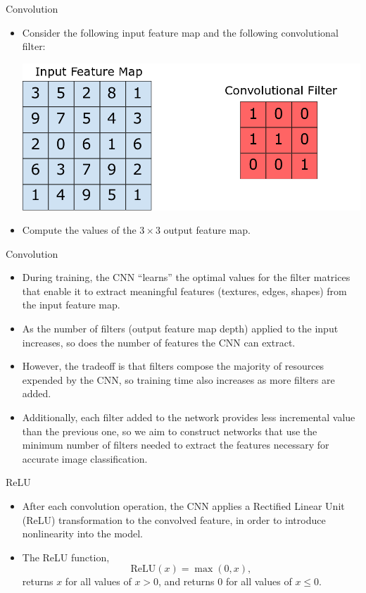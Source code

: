 \documentclass{beamer}
\begin{document}
\begin{frame}{Convolution}
\begin{itemize}
\item Consider the following input feature map and the following convolutional filter:

\medskip
\includegraphics[width=1.0\textwidth]{images/convolution_example.png}
\item Compute the values of the $3\times 3$ output feature map.
\end{itemize}
\end{frame}

\begin{frame}{Convolution}
\begin{itemize}
\item During training, the CNN ``learns'' the optimal values for the filter matrices that enable it to extract meaningful features (textures, edges, shapes) from the input feature map. 
\item As the number of filters (output feature map depth) applied to the input increases, so does the number of features the CNN can extract. 
\item However, the tradeoff is that filters compose the majority of resources expended by the CNN, so training time also increases as more filters are added. 
\item Additionally, each filter added to the network provides less incremental value than the previous one, so we aim to construct networks that use the minimum number of filters needed to extract the features necessary for accurate image classification.
\end{itemize}
\end{frame}

\begin{frame}{ReLU}
\begin{itemize}
\item After each convolution operation, the CNN applies a Rectified Linear Unit (ReLU) transformation to the convolved feature, in order to introduce nonlinearity into the model. 
\item The ReLU function, 
\[
\mathrm{ReLU}(x) = \max(0,x),
\]
returns $x$ for all values of $x > 0$, and returns $0$ for all values of $x \le 0$.
\end{itemize}
\end{frame}
\end{document}
